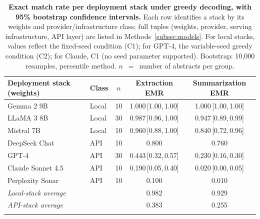 \documentclass[sn-nature]{sn-jnl}
\begin{document}
\begin{table}[t]
\caption{\textbf{Exact match rate per deployment stack under greedy decoding, with 95\% bootstrap confidence intervals.}
Each row identifies a stack by its weights and provider/infrastructure class; full tuples (weights, provider, serving infrastructure, API layer) are listed in Methods~\ref{subsec:models}.
For local stacks, values reflect the fixed-seed condition (C1); for GPT-4, the variable-seed greedy condition (C2); for Claude, C1 (no seed parameter supported).
Bootstrap: 10{,}000 resamples, percentile method.
$n$~$=$~number of abstracts per group.}\label{tab:main}
\footnotesize
\begin{tabular}{@{}llccc@{}}
\toprule
\textbf{Deployment stack (weights)} & \textbf{Class} & \textbf{$n$} & \textbf{Extraction EMR} & \textbf{Summarization EMR} \\
\midrule
Gemma 2 9B      & Local & 10 & 1.000\,[1.00,\,1.00] & 1.000\,[1.00,\,1.00] \\
LLaMA 3 8B      & Local & 30 & 0.987\,[0.96,\,1.00] & 0.947\,[0.89,\,0.99] \\
Mistral 7B      & Local & 10 & 0.960\,[0.88,\,1.00] & 0.840\,[0.72,\,0.96] \\
\midrule
DeepSeek Chat   & API   & 10 & 0.800 & 0.760 \\
GPT-4           & API   & 30 & 0.443\,[0.32,\,0.57] & 0.230\,[0.16,\,0.30] \\
Claude Sonnet 4.5 & API & 10 & 0.190\,[0.05,\,0.40] & 0.020\,[0.00,\,0.05] \\
Perplexity Sonar & API  & 10 & 0.100 & 0.010 \\
\midrule
\multicolumn{2}{l}{\textit{Local-stack average}} & & 0.982 & 0.929 \\
\multicolumn{2}{l}{\textit{API-stack average}}   & & 0.383 & 0.255 \\
\botrule
\end{tabular}
\normalsize
\end{table}
\end{document}
